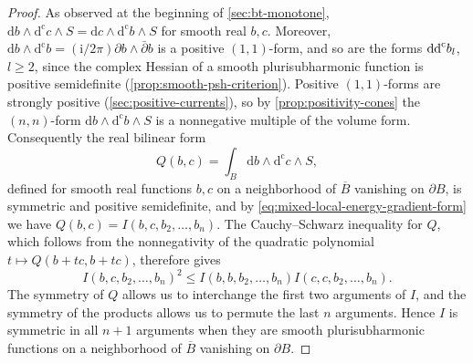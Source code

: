 \begin{proof}
As observed at the beginning of \cref{sec:bt-monotone}, $\mathrm db\wedge\mathrm d^{\mathrm c}c\wedge S=\mathrm dc\wedge\mathrm d^{\mathrm c}b\wedge S$ for smooth real $b,c$. Moreover, $\mathrm db\wedge\mathrm d^{\mathrm c}b=(\mathrm i/2\pi)\partial b\wedge\bar\partial b$ is a positive $(1,1)$-form, and so are the forms $\mathrm{dd}^{\mathrm{c}} b_l$, $l\geq2$, since the complex Hessian of a smooth plurisubharmonic function is positive semidefinite (\cref{prop:smooth-psh-criterion}). Positive $(1,1)$-forms are strongly positive (\cref{sec:positive-currents}), so by \cref{prop:positivity-cones} the $(n,n)$-form $\mathrm db\wedge\mathrm d^{\mathrm c}b\wedge S$ is a nonnegative multiple of the volume form. Consequently the real bilinear form
\[
 Q(b,c)=\int_B\mathrm db\wedge\mathrm d^{\mathrm c}c\wedge S,
\]
defined for smooth real functions $b,c$ on a neighborhood of $\overline B$ vanishing on $\partial B$, is symmetric and positive semidefinite, and by \eqref{eq:mixed-local-energy-gradient-form} we have $Q(b,c)=I(b,c,b_2,\ldots,b_n)$. The Cauchy--Schwarz inequality for $Q$, which follows from the nonnegativity of the quadratic polynomial $t\mapsto Q(b+tc,b+tc)$, therefore gives
\begin{equation}\label{eq:mixed-local-energy-two-slot}
 I(b,c,b_2,\ldots,b_n)^2
 \leq I(b,b,b_2,\ldots,b_n)I(c,c,b_2,\ldots,b_n).
\end{equation}
The symmetry of $Q$ allows us to interchange the first two arguments of $I$, and the symmetry of the products allows us to permute the last $n$ arguments. Hence $I$ is symmetric in all $n+1$ arguments when they are smooth plurisubharmonic functions on a neighborhood of $\overline B$ vanishing on $\partial B$.


\end{proof}
